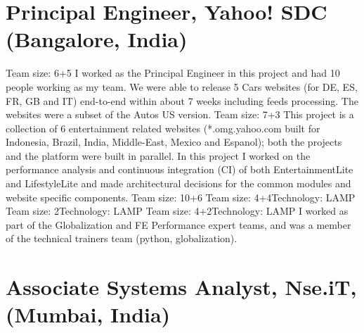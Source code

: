 \documentclass[11pt,a4paper,sans]{moderncv} %
\begin{document}
\section{Principal Engineer, Yahoo! SDC (Bangalore, India)}
         {Team size: 6+5}{}
         {I worked as the Principal Engineer in this project and had 10 people working as my team. We were able to release 5 Cars websites (for DE, ES, FR, GB and IT) end-to-end within about 7 weeks including feeds processing. The websites were a subset of the Autos US version.}
         {Team size: 7+3}{}
         {This project is a collection of 6 entertainment related websites (*.omg.yahoo.com built for Indonesia, Brazil, India, Middle-East, Mexico and Espanol); both the projects and the platform were built in parallel. In this project I worked on the performance analysis and continuous integration (CI) of both EntertainmentLite and LifestyleLite and made architectural decisions for the common modules and website specific components.} %
         {Team size: 10+6}{}
         {}
         {Team size: 4+4}{Technology: LAMP}{}
         {Team size: 2}{Technology: LAMP}{}
         {Team size: 4+2}{Technology: LAMP}{}
         {I worked as part of the Globalization and FE Performance expert teams, and was a member of the technical trainers team (python, globalization).}

\section{Associate Systems Analyst, Nse.iT, (Mumbai, India)}

\end{document}
